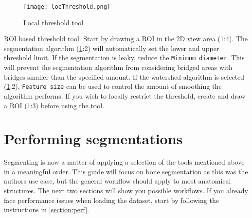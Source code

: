 \begin{figure}[h!]
	\centerline{
		\texttt{[image: locThreshold.png]}}
	\caption{Local threshold tool}\label{fig:lt}
\end{figure}
\noindent
ROI based threshold tool.
Start by drawing a ROI in the 2D view area (\cref{fig:lt}:4).
The segmentation algorithm (\cref{fig:lt}:2) will automatically set the lower and upper threshold limit.
If the segmentation is leaky, reduce the \texttt{Minimum diameter}.
This will prevent the segmentation algorithm from considering bridged areas with bridges smaller than the specified amount.
If the watershed algorithm is selected (\cref{fig:lt}:2), \texttt{Feature size} can be used to control the amount of smoothing the algorithm performs.
If you wish to locally restrict the threshold, create and draw a ROI (\cref{fig:lt}:3) before using the tool.

\pagebreak
\section{Performing segmentations}\label{section:quickstart}
Segmenting is now a matter of applying a selection of the tools mentioned above in a meaningful order.
This guide will focus on bone segmentation as this was the authors use case, but the general workflow should apply to most anatomical structures.
\noindent
The next two sections will show you possible workflows.
If you already face performance issues when loading the dataset, start by following the instructions in \cref{section:perf}.

